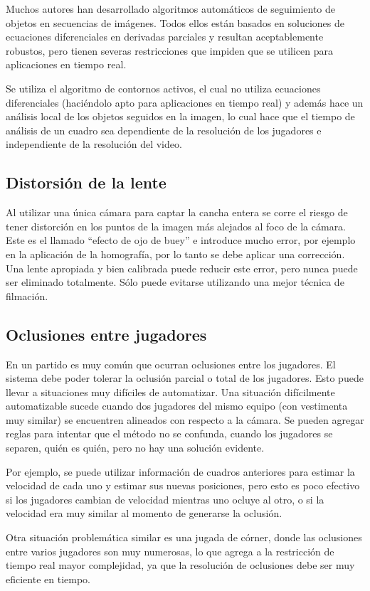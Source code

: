 Muchos autores han desarrollado algoritmos automáticos de seguimiento de
objetos en secuencias de imágenes\cite{IFTrace, alp, local-learning, MHT-2}.
Todos ellos están basados en soluciones de ecuaciones diferenciales en
derivadas parciales y resultan aceptablemente robustos, pero tienen severas
restricciones que impiden que se utilicen para aplicaciones en tiempo real.

Se utiliza el algoritmo de contornos activos\cite{fast-level-set}, el cual no
utiliza ecuaciones diferenciales (haciéndolo apto para aplicaciones en tiempo
real) y además hace un análisis local de los objetos seguidos en la imagen, lo
cual hace que el tiempo de análisis de un cuadro sea dependiente de la
resolución de los jugadores e independiente de la resolución del video.

\subsection{Distorsión de la lente}

Al utilizar una única cámara para captar la cancha entera se corre el riesgo de
tener distorción en los puntos de la imagen más alejados al foco de la cámara.
Este es el llamado ``efecto de ojo de buey'' e introduce mucho error, por
ejemplo en la aplicación de la homografía, por lo tanto se debe aplicar una
corrección. Una lente apropiada y bien calibrada puede reducir este error, pero
nunca puede ser eliminado totalmente. Sólo puede evitarse utilizando una mejor
técnica de filmación.

\subsection{Oclusiones entre jugadores}

En un partido es muy común que ocurran oclusiones entre los jugadores. El
sistema debe poder tolerar la oclusión parcial o total de los jugadores.
Esto puede llevar a situaciones muy difíciles de automatizar. Una situación
difícilmente automatizable sucede cuando dos jugadores del mismo equipo (con
vestimenta muy similar) se encuentren alineados con respecto a la cámara.
Se pueden agregar reglas para intentar que el método no se confunda, cuando
los jugadores se separen, quién es quién, pero no hay una solución evidente.

Por ejemplo, se puede utilizar información de cuadros anteriores para
estimar la velocidad de cada uno y estimar sus nuevas posiciones, pero esto
es poco efectivo si los jugadores cambian de velocidad mientras uno ocluye
al otro, o si la velocidad era muy similar al momento de generarse la oclusión.

Otra situación problemática similar es una jugada de córner, donde las
oclusiones entre varios jugadores son muy numerosas, lo que agrega a la
restricción de tiempo real mayor complejidad, ya que la resolución de
oclusiones debe ser muy eficiente en tiempo.

